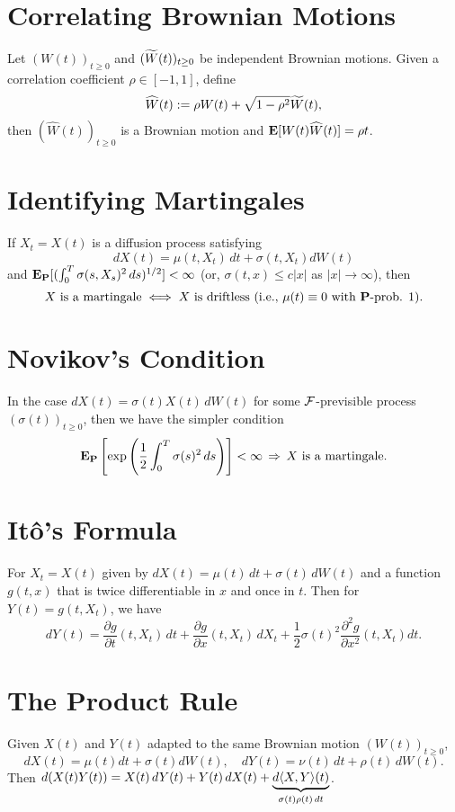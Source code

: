 \documentclass[twocolumn]{amsart}
\begin{document}
\section*{Correlating Brownian Motions}
Let $(W(t))_{t \ge 0}$ and $(\tW(t))_{t \ge 0}$ be independent Brownian motions. Given a correlation coefficient $\rho \in [-1,1]$, define
\begin{equation*}
    \widehat W(t) := \rho W(t) + \sqrt{1-\rho^2} \tW(t),
\end{equation*}
then $(\widehat W(t))_{t \ge 0}$ is a Brownian motion and $\E[W(t) \widehat W(t)] = \rho t$.

\section*{Identifying Martingales}

If $X_t = X(t)$ is a diffusion process satisfying $$dX(t) = \mu(t,X_t)\,dt + \sigma(t,X_t) dW(t)$$ and $\EP[(\int_0^T \sigma(s,X_s)^2\,ds)^{1/2}] < \infty$ (or, $\sigma(t,x) \le c |x|$ as $|x| \to \infty$), then
\[ X \text{ is a martingale} \iff X \text{ is driftless (i.e., $\mu(t) \equiv 0$ with $\P$-prob. 1).} \]

\section*{Novikov's Condition}

In the case $dX(t) = \sigma(t) X(t)\,dW(t)$ for some $\F$-previsible process $(\sigma(t))_{t \ge 0}$, then we have the simpler condition
\[ \EP \left[ \exp\left(\frac{1}{2} \int_0^T \sigma(s)^2\,ds\right) \right] < \infty\, \Rightarrow \, X \text{ is a martingale}. \]


\section*{It\^o's Formula}
For $X_t=X(t)$ given by $dX(t) = \mu(t)\,dt + \sigma(t)\,dW(t)$ and a function $g(t,x)$ that is twice differentiable in $x$ and once in $t$. Then for $Y(t) = g(t,X_t)$, we have
\[
dY(t) = \frac{\partial g}{\partial t}(t,X_t)\,dt + \frac{\partial g}{\partial x}(t,X_t)\,dX_t + \frac{1}{2} \sigma(t)^2 \frac{\partial ^2 g}{\partial x^2}(t,X_t)dt.
\]

\section*{The Product Rule}
Given $X(t)$ and $Y(t)$ adapted to the same Brownian motion $(W(t))_{t \ge 0}$,
\[
    dX(t) = \mu(t)dt +\sigma(t)dW(t), \quad
    dY(t) = \nu(t)\,dt + \rho(t)\,dW(t).
\]
Then $d(X(t) Y(t)) = X(t)\,d Y(t) + Y(t)\,dX(t) + \underbrace{d\QV{X,Y}(t)}_{\sigma(t) \rho(t)\,dt}$.
\end{document}
